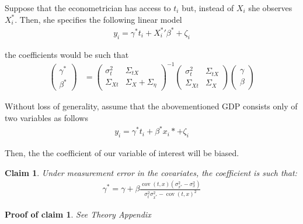 \documentclass[10pt]{article}
\newtheorem{claim}{Claim}
\newtheorem{claimproof}{Proof of claim}[claim]
\begin{document}
        Suppose that the econometrician has access to $t_i$ but, instead of $X_i$ she observes $X^*_i$. Then, she specifies the following linear model
        \begin{align}
            y_i = \gamma^* t_i + {X^{*}_i}' \beta^* + \zeta_i
        \end{align}
        
        the coefficients would be such that
        \begin{align}
            \left(\begin{array}{l}
        {\gamma}^* \\
        {\beta}^*
        \end{array}\right)
        & =\left(\begin{array}{cc}
        {\sigma}^2_{t} & \Sigma_{tX} \\
        \Sigma_{Xt} & {\Sigma}_{X}+{\Sigma}_{\eta}
        \end{array}\right)^{-1}\left(\begin{array}{cc}
        {\sigma}^2_{t} & \Sigma_{tX} \\
        \Sigma_{Xt} & {\Sigma}_{X}
        \end{array}\right)\left(\begin{array}{l}
        {\gamma} \\
        {\beta}
        \end{array}\right)
        \end{align}
        
        Without loss of generality, assume that the abovementioned GDP consists only of two variables as follows
        \begin{align}
                    y_i = \gamma^* t_i +  \beta^*x_i* + \zeta_i
                \end{align}
        
	Then, the the coefficient of our variable of interest will be biased.
	\begin{claim}
	\label{claim:one}
	Under measurement error in the covariates, the coefficient is such that:
	\begin{align}
            \gamma^* = \gamma + \beta\frac{\operatorname{cov}(t,x)(\sigma^2_{x^*}-\sigma^2_x)}{\sigma_{t}^2\sigma_{x^*}^2-\operatorname{cov}({t,x})^2}
        \end{align}
	\end{claim}
	
\begin{claimproof}
	See Theory Appendix
	\end{claimproof}
\end{document}
